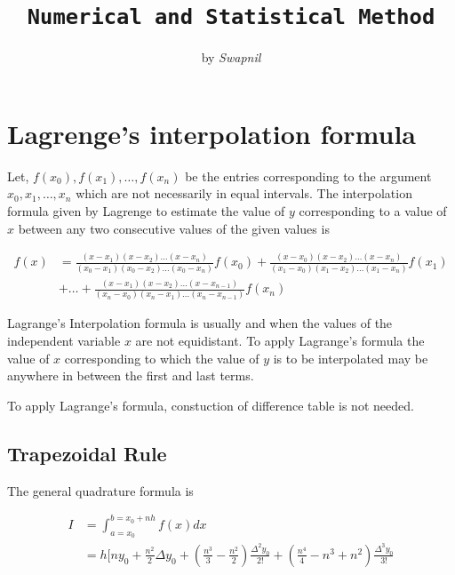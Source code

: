 \documentclass{article}
\title{\Huge{\texttt{Numerical and Statistical Method}}}
\author{\huge{by \emph{Swapnil}}}
\date{}
\begin{document}
      \maketitle
      \thispagestyle{empty}




    \section{Lagrenge's interpolation formula}
    Let, $f(x_0),f(x_1),\dots,f(x_n)$ be the entries corresponding to the argument 
    $x_0,x_1,\dots,x_n$ which are not necessarily in equal intervals. The interpolation 
    formula given by Lagrenge to estimate the value of $y$ corresponding to a value of $x$ 
    between any two consecutive values of the given values is

    \begin{align*}
      f(x)&=\frac{(x-x_1)(x-x_2)\dots(x-x_n)}{(x_0-x_1)(x_0-x_2)\dots(x_0-x_n)}f(x_0)+\frac{(x-x_0)(x-x_2)\dots(x-x_n)}{(x_1-x_0)(x_1-x_2)\dots(x_1-x_n)}f(x_1)\\
      &+ \dots +\frac{(x-x_1)(x-x_2)\dots(x-x_{n-1})}{(x_n-x_0)(x_n-x_1)\dots(x_n-x_{n-1})}f(x_n)
    \end{align*}

    Lagrange's Interpolation formula is usually and when the values of the independent
    variable $x$ are not equidistant. To apply Lagrange's formula the value of $x$ 
    corresponding to which the value of $y$ is to be interpolated may be anywhere in 
    between the first and last terms.
    
    To apply Lagrange's formula, constuction of difference table is not needed.
  
  \subsection{Trapezoidal Rule}
    The general quadrature formula is

    \begin{align*}
      I &=\int_{a=x_0}^{b=x_0+nh}f(x)dx\\
        &= h[ny_0+\frac{n^2}{2}\Delta y_0+(\frac{n^3}{3}-\frac{n^2}{2})\frac{\Delta^2y_0}{2!}+(\frac{n^4}{4}-n^3+n^2)\frac{\Delta^3y_0}{3!}
    \end{align*}
\end{document}
